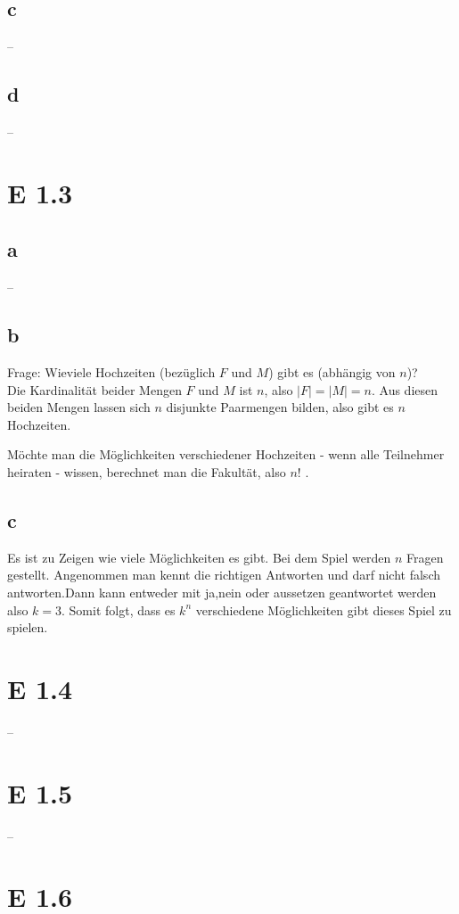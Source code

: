 \documentclass[12pt]{article}
\begin{document}
\subsection*{c}
--

\subsection*{d}
--
\section*{E 1.3}
\subsection*{a}
--
\subsection*{b}
Frage: Wieviele Hochzeiten (bezüglich $F$ und $M$) gibt es (abhängig von $n$)? \\

Die Kardinalität beider Mengen $F$ und $M$ ist $n$, also $|F| =|M| = n$. Aus diesen beiden Mengen
lassen sich $n$ disjunkte Paarmengen bilden, also gibt es $n$ Hochzeiten.


Möchte man die Möglichkeiten verschiedener Hochzeiten - wenn alle Teilnehmer heiraten -
 wissen, berechnet man die Fakultät, also $n!$ .

\subsection*{c}
Es ist zu Zeigen wie viele Möglichkeiten es gibt. Bei dem Spiel werden $n$ Fragen gestellt. Angenommen
man kennt die richtigen Antworten und darf nicht falsch antworten.Dann kann entweder mit ja,nein oder
aussetzen geantwortet werden also $k=3$. Somit folgt, dass es $k^n$ verschiedene Möglichkeiten gibt dieses
Spiel zu spielen. 

\section*{E 1.4}
--

\section*{E 1.5}
--


\section*{E 1.6}
\end{document}
